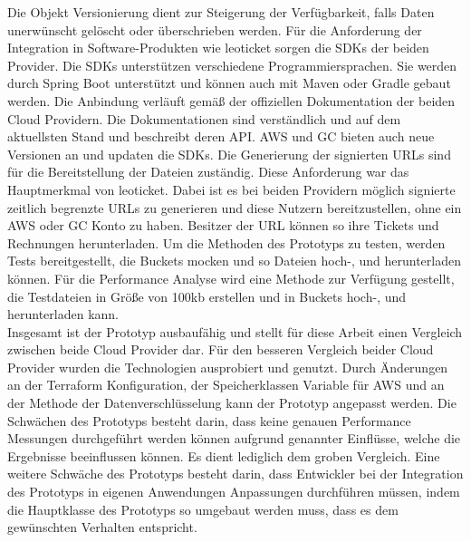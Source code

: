 Die Objekt Versionierung dient zur Steigerung der Verfügbarkeit, falls Daten unerwünscht gelöscht oder überschrieben werden. Für die Anforderung der Integration in Software-Produkten wie leoticket sorgen die SDKs der beiden Provider. Die SDKs unterstützen verschiedene Programmiersprachen. Sie werden durch Spring Boot unterstützt und können auch mit Maven oder Gradle gebaut werden. Die Anbindung verläuft gemäß der offiziellen Dokumentation der beiden Cloud Providern. Die Dokumentationen sind verständlich und auf dem aktuellsten Stand und beschreibt deren API. AWS und GC bieten auch neue Versionen an und updaten die SDKs. Die Generierung der signierten URLs sind für die Bereitstellung der Dateien zuständig. Diese Anforderung war das Hauptmerkmal von leoticket. Dabei ist es bei beiden Providern möglich signierte zeitlich begrenzte URLs zu generieren und diese Nutzern bereitzustellen, ohne ein AWS oder GC Konto zu haben. Besitzer der URL können so ihre Tickets und Rechnungen herunterladen. Um die Methoden des Prototyps zu testen, werden Tests bereitgestellt, die Buckets mocken und so Dateien hoch-, und herunterladen können. Für die Performance Analyse wird eine Methode zur Verfügung gestellt, die Testdateien in Größe von 100kb erstellen und in Buckets hoch-, und herunterladen kann.\\

Insgesamt ist der Prototyp ausbaufähig und stellt für diese Arbeit einen Vergleich zwischen beide Cloud Provider dar. Für den besseren Vergleich beider Cloud Provider wurden die Technologien ausprobiert und genutzt. Durch Änderungen an der Terraform Konfiguration, der Speicherklassen Variable für AWS und an der Methode der Datenverschlüsselung kann der Prototyp angepasst werden. Die Schwächen des Prototyps besteht darin, dass keine genauen Performance Messungen durchgeführt werden können aufgrund genannter Einflüsse, welche die Ergebnisse beeinflussen können. Es dient lediglich dem groben Vergleich. Eine weitere Schwäche des Prototyps besteht darin, dass Entwickler bei der Integration des Prototyps in eigenen Anwendungen Anpassungen durchführen müssen, indem die Hauptklasse des Prototyps so umgebaut werden muss, dass es dem gewünschten Verhalten entspricht.